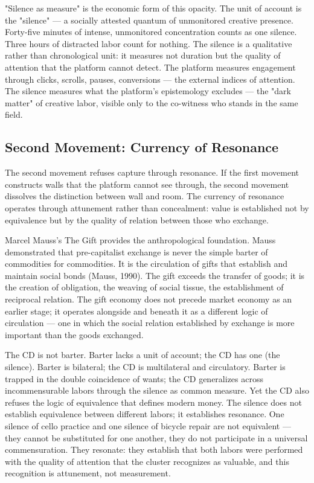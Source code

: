 "Silence as measure" is the economic form of this opacity. The unit of account is the "silence" — a socially attested quantum of unmonitored creative presence. Forty-five minutes of intense, unmonitored concentration counts as one silence. Three hours of distracted labor count for nothing. The silence is a qualitative rather than chronological unit: it measures not duration but the quality of attention that the platform cannot detect. The platform measures engagement through clicks, scrolls, pauses, conversions — the external indices of attention. The silence measures what the platform's epistemology excludes — the "dark matter" of creative labor, visible only to the co-witness who stands in the same field.

\subsection{Second Movement: Currency of Resonance}

The second movement refuses capture through resonance. If the first movement constructs walls that the platform cannot see through, the second movement dissolves the distinction between wall and room. The currency of resonance operates through attunement rather than concealment: value is established not by equivalence but by the quality of relation between those who exchange.

Marcel Mauss's The Gift provides the anthropological foundation. Mauss demonstrated that pre-capitalist exchange is never the simple barter of commodities for commodities. It is the circulation of gifts that establish and maintain social bonds (Mauss, 1990). The gift exceeds the transfer of goods; it is the creation of obligation, the weaving of social tissue, the establishment of reciprocal relation. The gift economy does not precede market economy as an earlier stage; it operates alongside and beneath it as a different logic of circulation — one in which the social relation established by exchange is more important than the goods exchanged.

The CD is not barter. Barter lacks a unit of account; the CD has one (the silence). Barter is bilateral; the CD is multilateral and circulatory. Barter is trapped in the double coincidence of wants; the CD generalizes across incommensurable labors through the silence as common measure. Yet the CD also refuses the logic of equivalence that defines modern money. The silence does not establish equivalence between different labors; it establishes resonance. One silence of cello practice and one silence of bicycle repair are not equivalent — they cannot be substituted for one another, they do not participate in a universal commensuration. They resonate: they establish that both labors were performed with the quality of attention that the cluster recognizes as valuable, and this recognition is attunement, not measurement.

